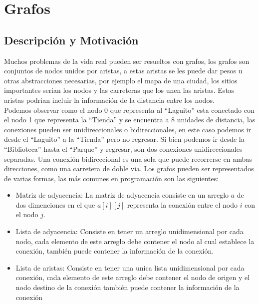 \chapter{Grafos}
\section{Descripción y Motivación}

Muchos problemas de la vida real pueden ser resueltos con grafos, los grafos son conjuntos de nodos unidos por aristas, a estas aristas se les puede dar pesos u otras abstracciones necesarias, por ejemplo el mapa de una ciudad, los sitios importantes serian los nodos y las carreteras que los unen las aristas. Estas aristas podrian incluir la información de la distancia entre los nodos.
\\
Podemos observar como el nodo $0$ que representa al ``Laguito'' esta conectado con el nodo 1 que representa la ``Tienda'' y se encuentra a 8 unidades de distancia, las conexiones pueden ser unidireccionales o bidireccionales, en este caso podemos ir desde el ``Laguito'' a la ``Tienda'' pero no regresar. Si bien podemos ir desde la ``Biblioteca'' hasta el ``Parque'' y regresar, son dos conexiones unidireccionales separadas. Una conexión bidireccional es una sola que puede recorrerse en ambas direcciones, como una carretera de doble via.
Los grafos pueden ser representados de varias formas, las más comunes en programación son las siguientes:
\\\begin{minipage}{\textwidth}
\begin{itemize}
\item 
Matriz de adyacencia: La matriz de adyacencia consiste en un arreglo $a$ de dos dimenciones en el que $a[i][j]$ representa la conexión entre el nodo $i$ con el nodo $j$.
\\
\item
Lista de adyacencia: Consiste en tener un arreglo unidimensional por cada nodo, cada elemento de este arreglo debe contener el nodo al cual establece la conexión, también puede contener la información de la conexión.
\\
\item
Lista de aristas: Consiste en tener una unica lista unidimensional por cada conexión, cada elemento de este arreglo debe contener el nodo de origen y el nodo destino de la conexión también puede contener la información de la conexión 
\\
\end{itemize}
\end{minipage}
